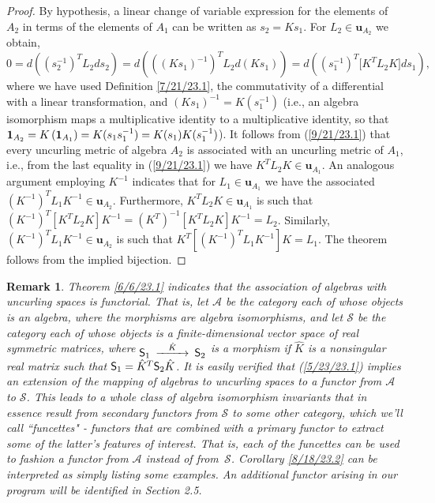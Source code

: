 \documentclass{amsart}
\numberwithin{equation}{section}
\newtheorem{remark}[theorem]{Remark}
\theoremstyle{definition}
\numberwithin{theorem}{section}
\begin{document}
\begin{proof} By hypothesis, a linear change of variable expression for the elements of $A_2$ in terms of the elements of $A_1$ can be written as $s_2= Ks_1$. For $L_2\in \mathbf{u}_{A_2}$ we obtain, \begin{equation} 0 = d\left((s_2^{-1})^T L_2 ds_2\right) =  d\left(((Ks_1)^{-1})^T L_2 d(Ks_1)\right) = d\left((s_1^{-1})^T \big[K^T L_2K\big]ds_1\right), \label{9/21/23.1}  \end{equation} where we have used Definition \ref{7/21/23.1}, the commutativity of a differential with a linear transformation, and $(Ks_1)^{-1} = K(s_1^{-1})$ (i.e., an algebra isomorphism maps a multiplicative identity to a multiplicative identity, so that ${\bf 1}_{A_2} = K\left(\mathbf{1}_{A_1}\right) = K(s_1s_1^{-1}) = K(s_1)K(s_1^{-1})$).  It follows from (\ref{9/21/23.1}) that every uncurling metric  of algebra $A_2$ is associated with an uncurling metric of $A_1$, i.e., from the last equality in (\ref{9/21/23.1}) we have  $K^TL_2K\in\mathbf{u}_{A_1}$.  An analogous argument employing $K^{-1}$ indicates that for $L_1\in\mathbf{u}_{A_1}$ we have the associated $(K^{-1})^T L_1 K^{-1} \in \mathbf{u}_{A_2}$.   Furthermore, $K^T L_2K\in\mathbf{u}_{A_1}$ is such that $(K^{-1})^T [K^T L_2 K]K^{-1} = (K^T)^{-1} [K^T L_2 K]K^{-1} = L_2$.  Similarly, $(K^{-1})^T L_1K^{-1}\in\mathbf{u}_{A_2}$ is such that $K^T[(K^{-1})^T L_1K^{-1}] K = L_1$.  The theorem follows from the implied bijection. 
\end{proof}

\begin{remark} \label{3/31/24.1} {\rm Theorem \ref{6/6/23.1} indicates that the association of algebras with uncurling spaces is functorial.  That is, let $\mathcal{A}$ be the category each of whose objects is an algebra, where the morphisms are algebra isomorphisms, and let $\mathcal{S}$ be the category each of whose objects is a finite-dimensional vector space of real symmetric matrices, where $\begin{CD}  {\sf S}_1 @>\hat{K}>> {\sf S}_2\end{CD}$ is a morphism if $\hat{K}$ is a nonsingular real matrix such that \mbox{${\sf S}_1  = \hat{K}^T  {\sf S}_2 \hat{K}$.}  It is easily verified that (\ref{5/23/23.1}) implies an extension of the mapping of algebras to uncurling spaces to a functor from $\mathcal{A}$ to $\mathcal{S}$.  This leads to a whole class of algebra isomorphism invariants that in essence result from secondary functors from $\mathcal{S}$ to some other category, which we'll call ``funcettes" - functors that are combined with a primary functor to extract some of the latter's features of interest.  That is, each of the funcettes can be used to fashion a functor from $\mathcal{A}$ instead of \mbox{from $\mathcal{S}$}.  Corollary \ref{8/18/23.2} can be interpreted as simply listing some examples.  An additional functor arising in our program will be identified in Section 2.5. }\end{remark}
\end{document}

